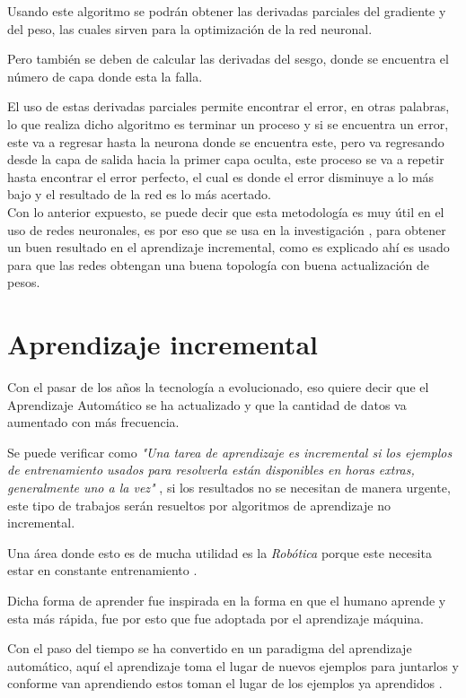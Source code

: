       Usando este algoritmo se podrán obtener las derivadas parciales del gradiente y del peso, las cuales sirven para la optimizaci\'on de la red neuronal.

      Pero también se deben de calcular las derivadas del sesgo, donde se encuentra el n\'umero de capa donde esta la falla.

      El uso de estas derivadas parciales permite encontrar el error, en otras palabras, lo que realiza dicho algoritmo es terminar un proceso y si se encuentra un error, este va a regresar hasta la neurona donde se encuentra este, pero va regresando desde la capa de salida hacia la primer capa oculta, este proceso se va a repetir hasta encontrar el error perfecto, el cual es donde el error disminuye a lo m\'as bajo y el resultado de la red es lo m\'as acertado.\\

      Con lo anterior expuesto, se puede decir que esta metodolog\'ia es muy \'util en el uso de redes neuronales, es por eso que se usa en la investigaci\'on \cite{bullinaria2009}, para obtener un buen resultado en el aprendizaje incremental, como es explicado ah\'i es usado para que las redes obtengan una buena topolog\'ia con buena actualizaci\'on de pesos.

  \section{Aprendizaje incremental}
    Con el pasar de los años la tecnología a evolucionado, eso quiere decir que el Aprendizaje Automático se ha actualizado y que la cantidad de datos va aumentado con más frecuencia.
    
    Se puede verificar como \textit{"Una tarea de aprendizaje es incremental si los ejemplos de entrenamiento usados para resolverla están disponibles en horas extras, generalmente uno a la vez"} \cite{GiraudCarrier2000}, si los resultados no se necesitan de manera urgente, este tipo de trabajos serán resueltos por algoritmos de aprendizaje no incremental. 

    Una área donde esto es de mucha utilidad es la \textit{Rob\'otica} porque este necesita estar en constante entrenamiento \cite{GiraudCarrier2000}.

    Dicha forma de aprender fue inspirada en la forma en que el humano aprende y esta más rápida, fue por esto que fue adoptada por el aprendizaje m\'aquina.

    Con el paso del tiempo se ha convertido en un paradigma del aprendizaje automático, aquí el aprendizaje toma el lugar de nuevos ejemplos para juntarlos y conforme van aprendiendo estos toman el lugar de los ejemplos ya aprendidos \cite{liu2015}.

